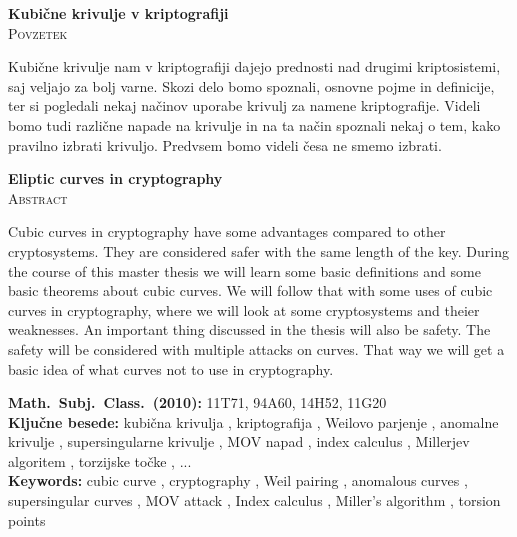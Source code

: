 \documentclass[12pt,a4paper,twoside]{article}
\newcommand{\naslovdela}{Kubične krivulje v kriptografiji}
\newcommand{\kljucnebesede}{kubična krivulja \sep kriptografija \sep Weilovo parjenje \sep anomalne krivulje \sep supersingularne krivulje \sep MOV napad \sep index calculus \sep Millerjev algoritem \sep torzijske točke \sep ...} %
\newcommand{\keywords}{cubic curve \sep cryptography \sep Weil pairing \sep anomalous curves \sep supersingular curves \sep MOV attack \sep Index calculus \sep Miller's algorithm \sep torsion points} %
\newcommand{\sep}{, }  %
\theoremstyle{definition} %
\theoremstyle{plain} %
\numberwithin{equation}{section}  %
\begin{document}

\cleardoublepage
{}

\begin{center}
\textbf{\naslovdela} \\[3mm]
\textsc{Povzetek} \\[2mm]
\end{center}
Kubične krivulje nam v kriptografiji dajejo prednosti nad drugimi kriptosistemi, saj veljajo za bolj varne. Skozi delo bomo spoznali, osnovne pojme in definicije, ter si pogledali nekaj načinov uporabe krivulj za namene kriptografije. Videli bomo tudi različne napade na krivulje in na ta način spoznali nekaj o tem, kako pravilno izbrati krivuljo. Predvsem bomo videli česa ne smemo izbrati.

\vfill
\begin{center}
\textbf{Eliptic curves in cryptography} \\[3mm] %
\textsc{Abstract}\\[2mm]
\end{center}

Cubic curves in cryptography have some advantages compared to other cryptosystems. They are considered safer with the same length of the key. During the course of this master thesis we will learn some basic definitions and some basic theorems about cubic curves. We will follow that with some uses of cubic curves in cryptography, where we will look at some cryptosystems and theier weaknesses. An important thing discussed in the thesis will also be safety. The safety will be considered with multiple attacks on curves. That way we will get a basic idea of what curves not to use in cryptography. 

\vfill\noindent
\textbf{Math.~Subj.~Class.~(2010):}	11T71, 94A60, 14H52, 11G20  \\[1mm]
\textbf{Ključne besede:} \kljucnebesede \\[1mm]
\textbf{Keywords:} \keywords

\cleardoublepage

\setcounter{page}{1}    %



\end{document}
